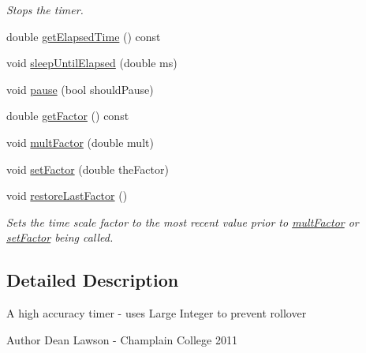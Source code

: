 \begin{DoxyCompactItemize}
\begin{DoxyCompactList}\small\item\em Stops the timer. \end{DoxyCompactList}\item 
double \hyperlink{class_timer_ad306e18f8d8a0296e001683f92d7f86e}{get\-Elapsed\-Time} () const 
\item 
void \hyperlink{class_timer_a918584568a93c6cff18e3fddca0c1d44}{sleep\-Until\-Elapsed} (double ms)
\item 
void \hyperlink{class_timer_a3697dc7e11780a904fee957f2f1b2a36}{pause} (bool should\-Pause)
\item 
double \hyperlink{class_timer_ac2e8200d547385c0bff2d836716b0a2d}{get\-Factor} () const 
\item 
void \hyperlink{class_timer_a0e116daa696f3d5cd9dc3d2092606761}{mult\-Factor} (double mult)
\item 
void \hyperlink{class_timer_a0da285550f750a5ba6c16e5766785883}{set\-Factor} (double the\-Factor)
\item 
\hypertarget{class_timer_a7e8da31c3ef153c7b89ea971a4674476}{void \hyperlink{class_timer_a7e8da31c3ef153c7b89ea971a4674476}{restore\-Last\-Factor} ()}\label{class_timer_a7e8da31c3ef153c7b89ea971a4674476}

\begin{DoxyCompactList}\small\item\em Sets the time scale factor to the most recent value prior to \hyperlink{class_timer_a0e116daa696f3d5cd9dc3d2092606761}{mult\-Factor} or \hyperlink{class_timer_a0da285550f750a5ba6c16e5766785883}{set\-Factor} being called. \end{DoxyCompactList}\end{DoxyCompactItemize}


\subsection{Detailed Description}
A high accuracy timer -\/ uses Large Integer to prevent rollover \begin{DoxyAuthor}{Author}
Dean Lawson -\/ Champlain College 2011 
\end{DoxyAuthor}



